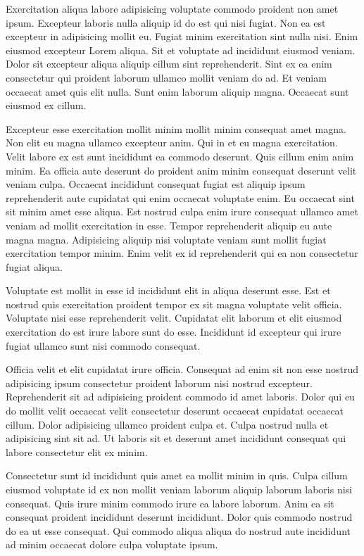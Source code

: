 
Exercitation aliqua labore adipisicing voluptate commodo proident non amet ipsum. Excepteur laboris nulla aliquip id do est qui nisi fugiat. Non ea est excepteur in adipisicing mollit eu. Fugiat minim exercitation sint nulla nisi. Enim eiusmod excepteur Lorem aliqua. Sit et voluptate ad incididunt eiusmod veniam. Dolor sit excepteur aliqua aliquip cillum sint reprehenderit. Sint ex ea enim consectetur qui proident laborum ullamco mollit veniam do ad. Et veniam occaecat amet quis elit nulla. Sunt enim laborum aliquip magna. Occaecat sunt eiusmod ex cillum.

Excepteur esse exercitation mollit minim mollit minim consequat amet magna. Non elit eu magna ullamco excepteur anim. Qui in et eu magna exercitation. Velit labore ex est sunt incididunt ea commodo deserunt. Quis cillum enim anim minim. Ea officia aute deserunt do proident anim minim consequat deserunt velit veniam culpa. Occaecat incididunt consequat fugiat est aliquip ipsum reprehenderit aute cupidatat qui enim occaecat voluptate enim. Eu occaecat sint sit minim amet esse aliqua. Est nostrud culpa enim irure consequat ullamco amet veniam ad mollit exercitation in esse. Tempor reprehenderit aliquip eu aute magna magna. Adipisicing aliquip nisi voluptate veniam sunt mollit fugiat exercitation tempor minim. Enim velit ex id reprehenderit qui ea non consectetur fugiat aliqua.

Voluptate est mollit in esse id incididunt elit in aliqua deserunt esse. Est et nostrud quis exercitation proident tempor ex sit magna voluptate velit officia. Voluptate nisi esse reprehenderit velit. Cupidatat elit laborum et elit eiusmod exercitation do est irure labore sunt do esse. Incididunt id excepteur qui irure fugiat ullamco sunt nisi commodo consequat.

Officia velit et elit cupidatat irure officia. Consequat ad enim sit non esse nostrud adipisicing ipsum consectetur proident laborum nisi nostrud excepteur. Reprehenderit sit ad adipisicing proident commodo id amet laboris. Dolor qui eu do mollit velit occaecat velit consectetur deserunt occaecat cupidatat occaecat cillum. Dolor adipisicing ullamco proident culpa et. Culpa nostrud nulla et adipisicing sint sit ad. Ut laboris sit et deserunt amet incididunt consequat qui labore consectetur elit ex minim.

Consectetur sunt id incididunt quis amet ea mollit minim in quis. Culpa cillum eiusmod voluptate id ex non mollit veniam laborum aliquip laborum laboris nisi consequat. Quis irure minim commodo irure ea labore laborum. Anim ea sit consequat proident incididunt deserunt incididunt. Dolor quis commodo nostrud do ea ut esse consequat. Qui commodo aliqua aliqua do nostrud aute incididunt ad minim occaecat dolore culpa voluptate ipsum.
